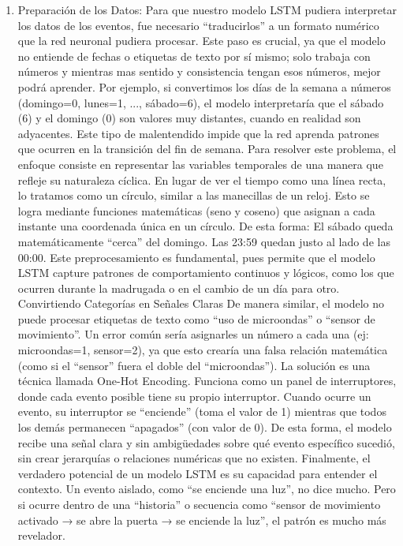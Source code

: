       \begin{enumerate}
            \item Preparación de los Datos:
                  Para que nuestro modelo LSTM pudiera interpretar los datos de los eventos, fue necesario ``traducirlos'' a un formato numérico que la red neuronal pudiera procesar. Este paso es crucial, ya que el modelo no entiende de fechas o etiquetas de texto por sí mismo; solo trabaja con números y mientras mas sentido y consistencia tengan esos números, mejor podrá aprender.
                  Por ejemplo, si convertimos los días de la semana a números (domingo=0, lunes=1, ..., sábado=6), el modelo interpretaría que el sábado (6) y el domingo (0) son valores muy distantes, cuando en realidad son adyacentes. Este tipo de malentendido impide que la red aprenda patrones que ocurren en la transición del fin de semana.
                  Para resolver este problema, el enfoque consiste en representar las variables temporales de una manera que refleje su naturaleza cíclica. En lugar de ver el tiempo como una línea recta, lo tratamos como un círculo, similar a las manecillas de un reloj. Esto se logra mediante funciones matemáticas (seno y coseno) que asignan a cada instante una coordenada única en un círculo. De esta forma:
                  El sábado queda matemáticamente ``cerca'' del domingo.
                  Las 23:59 quedan justo al lado de las 00:00.
                  Este preprocesamiento es fundamental, pues permite que el modelo LSTM capture patrones de comportamiento continuos y lógicos, como los que ocurren durante la madrugada o en el cambio de un día para otro.
                  Convirtiendo Categorías en Señales Claras
                  De manera similar, el modelo no puede procesar etiquetas de texto como ``uso de microondas'' o ``sensor de movimiento''. Un error común sería asignarles un número a cada una (ej: microondas=1, sensor=2), ya que esto crearía una falsa relación matemática (como si el ``sensor'' fuera el doble del ``microondas'').
                  La solución es una técnica llamada One-Hot Encoding. Funciona como un panel de interruptores, donde cada evento posible tiene su propio interruptor.
                  Cuando ocurre un evento, su interruptor se ``enciende'' (toma el valor de 1) mientras que todos los demás permanecen ``apagados'' (con valor de 0). De esta forma, el modelo recibe una señal clara y sin ambigüedades sobre qué evento específico sucedió, sin crear jerarquías o relaciones numéricas que no existen.
                  Finalmente, el verdadero potencial de un modelo LSTM es su capacidad para entender el contexto. Un evento aislado, como ``se enciende una luz'', no dice mucho. Pero si ocurre dentro de una ``historia'' o secuencia como ``sensor de movimiento activado → se abre la puerta → se enciende la luz'', el patrón es mucho más revelador.

\end{enumerate}
